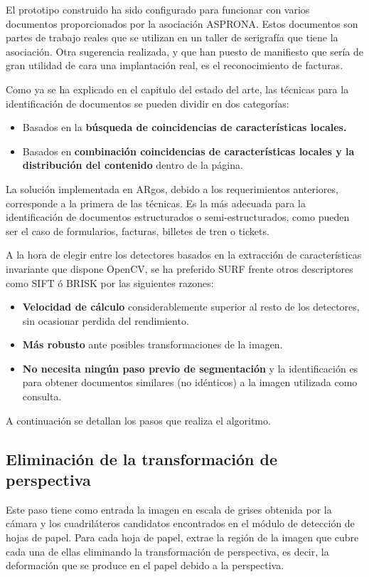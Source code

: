 El prototipo construido ha sido configurado para funcionar con varios documentos proporcionados
por la asociación ASPRONA. Estos documentos son partes de trabajo reales que se utilizan en un
taller de serigrafía que tiene la asociación. Otra sugerencia realizada, y que han puesto de
manifiesto que sería de gran utilidad de cara una implantación real, es el reconocimiento de facturas.

Como ya se ha explicado en el capitulo del estado del arte, las técnicas para la identificación de
documentos se pueden dividir en dos categorías:

\begin{itemize}
\item Basados en la \textbf{búsqueda de coincidencias de características locales.}
\item Basados en \textbf{combinación coincidencias de características locales y la distribución del contenido} dentro de la página.
\end{itemize}

La solución implementada en ARgos, debido a los requerimientos anteriores, corresponde a la primera
de las técnicas. Es la más adecuada para la identificación de documentos estructurados o
semi-estructurados, como pueden ser el caso de formularios, facturas, billetes de tren o tickets.

A la hora de elegir entre los detectores basados en la extracción de características invariante que
dispone OpenCV, se ha preferido SURF frente otros descriptores como SIFT ó BRISK por las siguientes razones:

\begin{itemize}
\item \textbf{Velocidad de cálculo} considerablemente superior al resto de los detectores, sin ocasionar perdida del rendimiento.
\item \textbf{Más robusto} ante posibles transformaciones de la imagen.
\item \textbf{No necesita ningún paso previo de segmentación} y la identificación es para obtener documentos similares (no
idénticos) a la imagen utilizada como consulta.
\end{itemize}

A continuación se detallan los pasos que realiza el algoritmo.

\subsection{Eliminación de la transformación de perspectiva}
Este paso tiene como entrada la imagen en escala de grises obtenida
por la cámara y los cuadriláteros candidatos encontrados en el módulo
de detección de hojas de papel. Para cada hoja de papel, extrae la
región de la imagen que cubre cada una de ellas eliminando la
transformación de perspectiva, es decir, la deformación que se produce
en el papel debido a la perspectiva.

